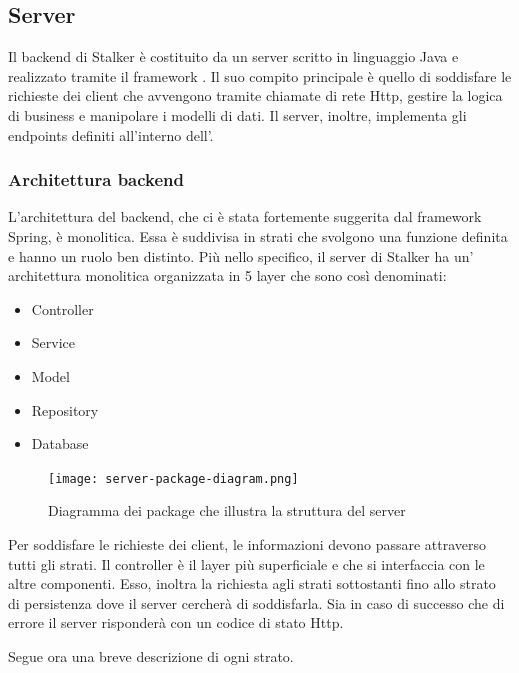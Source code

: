 \documentclass[../manuale-manutentore.tex]{subfiles}
\begin{document}
\subsection{Server}%
\label{sub:architettura/server}

Il backend di Stalker è costituito da un server scritto in linguaggio Java e realizzato tramite il framework .
Il suo compito principale è quello di  soddisfare le richieste dei client che avvengono tramite chiamate di rete Http, gestire la logica di business e manipolare i modelli di dati.
Il server, inoltre, implementa gli endpoints definiti all'interno dell'.

\subsubsection{Architettura backend}%
\label{architettura_backend}

L'architettura del backend, che ci è stata fortemente suggerita dal framework Spring, è monolitica.
Essa è suddivisa in strati che svolgono una funzione definita e hanno un ruolo ben distinto.
Più nello specifico, il server di Stalker ha un' architettura monolitica organizzata in 5 layer che sono così denominati:
\begin{itemize}
  \item Controller
  \item Service
  \item Model
  \item Repository
  \item Database
\end{itemize}

\begin{figure}[H]
  \centering
  \texttt{[image: server-package-diagram.png]}
  \caption{Diagramma dei package che illustra la struttura del server}%
   \label{fig:diagramma dei package che illustra la struttura del server}
\end{figure}

Per soddisfare le richieste dei client, le informazioni devono passare attraverso tutti gli strati.
Il controller è il layer più superficiale e che si interfaccia con le altre componenti.
Esso, inoltra la richiesta agli strati sottostanti fino allo strato di persistenza dove il server cercherà di soddisfarla.
Sia in caso di successo che di errore il server risponderà con un codice di stato Http.

Segue ora una breve descrizione di ogni strato.
\end{document}
